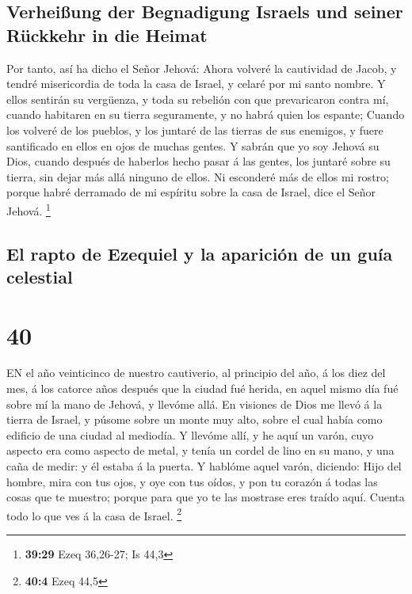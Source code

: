 \hypertarget{verheiuxdfung-der-begnadigung-israels-und-seiner-ruxfcckkehr-in-die-heimat}{%
\subsection{Verheißung der Begnadigung Israels und seiner Rückkehr in
die
Heimat}\label{verheiuxdfung-der-begnadigung-israels-und-seiner-ruxfcckkehr-in-die-heimat}}

 Por tanto, así ha dicho el Señor Jehová: Ahora volveré la
cautividad de Jacob, y tendré misericordia de toda la casa de Israel, y
celaré por mi santo nombre.  Y ellos sentirán su vergüenza,
y toda su rebelión con que prevaricaron contra mí, cuando habitaren en
su tierra seguramente, y no habrá quien los espante; 
Cuando los volveré de los pueblos, y los juntaré de las tierras de sus
enemigos, y fuere santificado en ellos en ojos de muchas gentes.
 Y sabrán que yo soy Jehová su Dios, cuando después de
haberlos hecho pasar á las gentes, los juntaré sobre su tierra, sin
dejar más allá ninguno de ellos.  Ni esconderé más de ellos
mi rostro; porque habré derramado de mi espíritu sobre la casa de
Israel, dice el Señor Jehová. \footnote{\textbf{39:29} Ezeq 36,26-27; Is
  44,3}

\hypertarget{el-rapto-de-ezequiel-y-la-apariciuxf3n-de-un-guuxeda-celestial}{%
\subsection{El rapto de Ezequiel y la aparición de un guía
celestial}\label{el-rapto-de-ezequiel-y-la-apariciuxf3n-de-un-guuxeda-celestial}}

\hypertarget{section-39}{%
\section{40}\label{section-39}}

 EN el año veinticinco de nuestro cautiverio, al principio
del año, á los diez del mes, á los catorce años después que la ciudad
fué herida, en aquel mismo día fué sobre mí la mano de Jehová, y llevóme
allá.  En visiones de Dios me llevó á la tierra de Israel, y
púsome sobre un monte muy alto, sobre el cual había como edificio de una
ciudad al mediodía.  Y llevóme allí, y he aquí un varón,
cuyo aspecto era como aspecto de metal, y tenía un cordel de lino en su
mano, y una caña de medir: y él estaba á la puerta.  Y
hablóme aquel varón, diciendo: Hijo del hombre, mira con tus ojos, y oye
con tus oídos, y pon tu corazón á todas las cosas que te muestro; porque
para que yo te las mostrase eres traído aquí. Cuenta todo lo que ves á
la casa de Israel. \footnote{\textbf{40:4} Ezeq 44,5}

